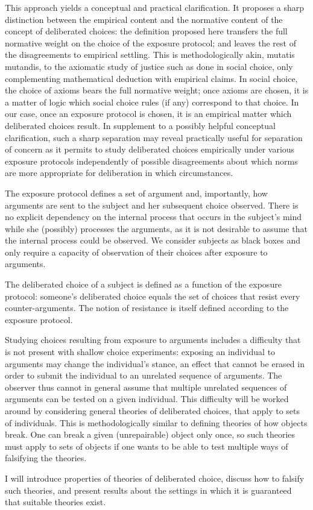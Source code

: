 \documentclass[version=last, pagesize, twoside=off, bibliography=totoc, DIV=calc, fontsize=12pt, a4paper, french, english]{scrartcl}
\begin{document}
This approach yields a conceptual and practical clarification. It proposes a sharp distinction between the empirical content and the normative content of the concept of deliberated choices: the definition proposed here transfers the full normative weight on the choice of the exposure protocol; and leaves the rest of the disagreements to empirical settling. This is methodologically akin, mutatis mutandis, to the axiomatic study of justice such as done in social choice, only complementing mathematical deduction with empirical claims. In social choice, the choice of axioms bears the full normative weight; once axioms are chosen, it is a matter of logic which social choice rules (if any) correspond to that choice. In our case, once an exposure protocol is chosen, it is an empirical matter which deliberated choices result.
In supplement to a possibly helpful conceptual clarification, such a sharp separation may reveal practically useful for separation of concern as it permits to study deliberated choices empirically under various exposure protocols independently of possible disagreements about which norms are more appropriate for deliberation in which circumstances.

The exposure protocol defines a set of argument and, importantly, how arguments are sent to the subject and her subsequent choice observed. There is no explicit dependency on the internal process that occurs in the subject’s mind while she (possibly) processes the arguments, as it is not desirable to assume that the internal process could be observed. We consider subjects as black boxes and only require a capacity of observation of their choices after exposure to arguments.

The deliberated choice of a subject is defined as a function of the exposure protocol: someone’s deliberated choice equals the set of choices that resist every counter-arguments. The notion of resistance is itself defined according to the exposure protocol.

Studying choices resulting from exposure to arguments includes a difficulty that is not present with shallow choice experiments: exposing an individual to arguments may change the individual’s stance, an effect that cannot be erased in order to submit the individual to an unrelated sequence of arguments. The observer thus cannot in general assume that multiple unrelated sequences of arguments can be tested on a given individual. This difficulty will be worked around by considering general theories of deliberated choices, that apply to sets of individuals. This is methodologically similar to defining theories of how objects break. One can break a given (unrepairable) object only once, so such theories must apply to sets of objects if one wants to be able to test multiple ways of falsifying the theories.

I will introduce properties of theories of deliberated choice, discuss how to falsify such theories, and present results about the settings in which it is guaranteed that suitable theories exist.


\end{document}
